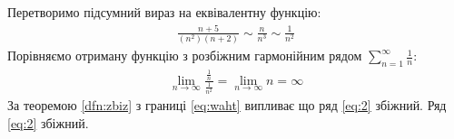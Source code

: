 \solving
Перетворимо підсумний вираз на еквівалентну функцію:
\begin{gather}
	\frac{n+5}{(n^2)(n+2)}\sim \frac{n}{n^3}\sim \frac{1}{n^2}
\end{gather}
Порівняємо отриману функцію з розбіжним гармонійним рядом \(\sum_{n=1}^\infty\frac{1}{n}\):
\begin{gather}
	\lim_{n\to\infty}\frac{\frac{1}{n}}{\frac{1}{n^2}}=\lim_{n\to\infty}n=\infty \label{eq:waht}
\end{gather}
За теоремою \ref{dfn:zbiz} з границі \ref{eq:waht} випливає що ряд \ref{eq:2} збіжний.
\ansver
Ряд \ref{eq:2} збіжний.

